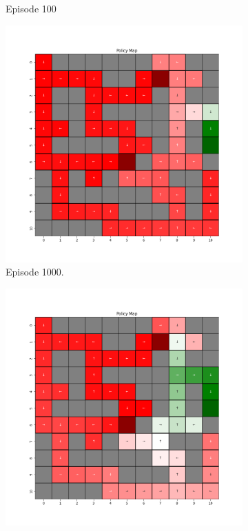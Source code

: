 \documentclass{assignment}
\begin{document}
\begin{figure}[H]
\begin{subfigure}{0.3\textwidth}
    \caption{Episode 100}
    \end{subfigure}
    \begin{subfigure}{0.3\textwidth}
        \includegraphics[width=\textwidth]{figures/policy_q/epsilon_sweep/policy_alpha_0.1_gamma_0.95_epsilon_1.0_iteration_1000.png}
    \caption{Episode 1000.}
    \end{subfigure}\hfill
    \begin{subfigure}{0.3\textwidth}
        \includegraphics[width=\textwidth]{figures/policy_q/epsilon_sweep/policy_alpha_0.1_gamma_0.95_epsilon_1.0_iteration_5000.png}

\end{subfigure}
\end{figure}
\end{document}
